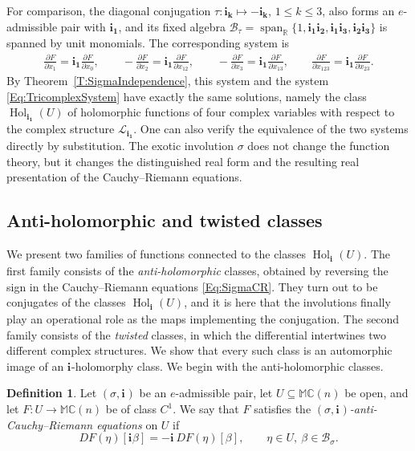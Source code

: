 \documentclass[12pt]{amsart}
\theoremstyle{plain}
\theoremstyle{definition}
\newtheorem{definition}[theorem]{Definition}
\numberwithin{equation}{section}
\newcommand{\im}[1]{\mathbf{ i_{#1}}}
\newcommand{\mC}{\mathbb{C}}
\newcommand{\mR}{\mathbb{R}}
\newcommand{\mM}{\mathbb{M}}
\newcommand{\cL}{\mathcal{L}}
\newcommand{\cB}{\mathcal{B}}
\DeclareMathOperator{\spn}{span}
\DeclareMathOperator{\hol}{Hol}
\begin{document}
For comparison, the diagonal conjugation $\tau : \im{k} \mapsto - \im{k}$, $1 \leq k \leq 3$, also forms an $e$-admissible pair with $\im{1}$, and its fixed algebra $\cB_{\tau} = \spn_{\mR} \{ 1 , \im{1}\im{2} , \im{1}\im{3} , \im{2}\im{3} \}$ is spanned by unit monomials. The corresponding system is
    \begin{align*}
    \frac{\partial F}{\partial x_1} = \im{1} \frac{\partial F}{\partial x_0} , \qquad
    - \frac{\partial F}{\partial x_2} = \im{1} \frac{\partial F}{\partial x_{12}} , \qquad
    - \frac{\partial F}{\partial x_3} = \im{1} \frac{\partial F}{\partial x_{13}} , \qquad
    \frac{\partial F}{\partial x_{123}} = \im{1} \frac{\partial F}{\partial x_{23}}.
    \end{align*}
By Theorem~\ref{T:SigmaIndependence}, this system and the system \eqref{Eq:TricomplexSystem} have exactly the same solutions, namely the class $\hol_{\im{1}} (U)$ of holomorphic functions of four complex variables with respect to the complex structure $\cL_{\im{1}}$. One can also verify the equivalence of the two systems directly by substitution. The exotic involution $\sigma$ does not change the function theory, but it changes the distinguished real form and the resulting real presentation of the Cauchy--Riemann equations.

\subsection{Anti-holomorphic and twisted classes}\label{SS:Beyond}

We present two families of functions connected to the classes $\hol_{\im{}} (U)$. The first family consists of the \emph{anti-holomorphic} classes, obtained by reversing the sign in the Cauchy--Riemann equations \eqref{Eq:SigmaCR}. They turn out to be conjugates of the classes $\hol_{\im{}} (U)$, and it is here that the involutions finally play an operational role as the maps implementing the conjugation. The second family consists of the \emph{twisted} classes, in which the differential intertwines two different complex structures. We show that every such class is an automorphic image of an $\im{}$-holomorphy class.
We begin with the anti-holomorphic classes.

    \begin{definition}\label{D:AntiCR}
    Let $(\sigma,\im{})$ be an $e$-admissible pair, let $U\subseteq\mM \mC(n)$ be open, and let $F:U\to\mM \mC(n)$ be of class $C^1$. We say that $F$ satisfies the \emph{$(\sigma , \im{})$-anti-Cauchy--Riemann equations} on $U$ if
        \begin{equation}\label{Eq:AntiCR}
        D F (\eta ) [ \im{} \beta ] = - \im{}\, DF (\eta ) [\beta] , \qquad \eta \in U , \ \beta \in \cB_\sigma.
        \end{equation}
    \end{definition}
\end{document}
